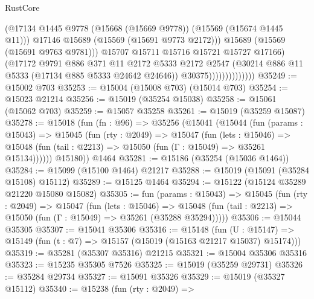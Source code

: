 \begin{lexlean}{RustCore}
\begin{coremodule}
                                    (@17134
                                      @1445
                                      @9778
                                      (@15668 (@15669 @9778))
                                      (@15569 (@15674 @1445 @11)))
                                    @17146
                                    @15689
                                    (@15569 (@15691 @9773 @2172)))
                                  @15689
                                  (@15569 (@15691 @9763 @9781)))
                                @15707
                                @15711
                                @15716
                                @15721
                                @15727
                                @17166)
                              (@17172
                                @9791
                                @886
                                @371
                                @11
                                @2172
                                @5333
                                @2172
                                @2547
                                (@30214 @886 @11 @5333 (@17134 @885 @5333 @24642 @24646))
                                @30375))))))))))))))
@35249 := @15002 @703
@35253 := @15004 (@15008 @703) (@15014 @703)
@35254 := @15023 @21214
@35256 := @15019 (@35254 @15038)
@35258 := @15061 (@15062 @703)
@35259 := @15057 @35258
@35261 := @15019 (@35259 @15087)
@35278 := @15018
    (fun (fn : @96) =>
    @35256
      (@15041
        (@15044
          (fun (params : @15043) =>
          @15045
            (fun (rty : @2049) =>
            @15047
              (fun (lets : @15046) =>
              @15048 (fun (tail : @2213) => @15050 (fun (Γ : @15049) => @35261 @15134))))))
        @15180))
    @1464
@35281 := @15186 (@35254 (@15036 @1464))
@35284 := @15099 (@15100 @1464) @21217
@35288 := @15019 (@15091 (@35284 @15108) @15112)
@35289 := @15125 @1464
@35294 := @15122 (@15124 @35289 @21220 @15080 @15082)
@35305 := fun (params : @15043) =>
  @15045
    (fun (rty : @2049) =>
    @15047
      (fun (lets : @15046) =>
      @15048 (fun (tail : @2213) => @15050 (fun (Γ : @15049) => @35261 (@35288 @35294)))))
@35306 := @15044 @35305
@35307 := @15041 @35306
@35316 := @15148
    (fun (U : @15147) => @15149 (fun (t : @7) => @15157 (@15019 (@15163 @21217 @15037) @15174)))
@35319 := @35281 (@35307 @35316) @21215
@35321 := @15004 @35306 @35316
@35323 := @15235 @35305 @7526
@35325 := @15019 (@35259 @29731)
@35326 := @35284 @29734
@35327 := @15091 @35326
@35329 := @15019 (@35327 @15112)
@35340 := @15238
    (fun (rty : @2049) =>

\end{coremodule}
\end{lexlean}
